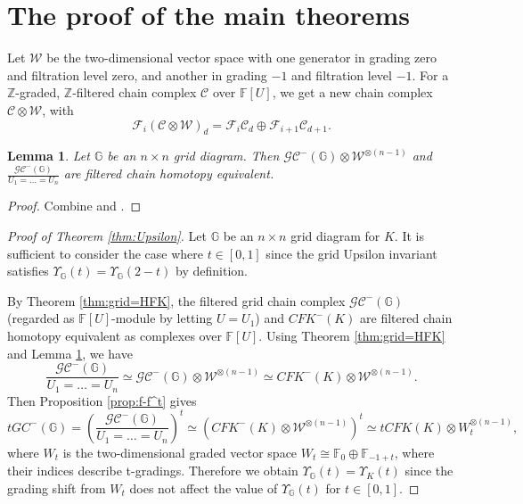\documentclass[12pt]{amsart}
\theoremstyle{plain}
\theoremstyle{definition}
\theoremstyle{plain}
\newtheorem{lem}[thm]{Lemma}
\theoremstyle{definition}
\newcommand{\G}{\mathbb{G}}
\numberwithin{equation}{section}
\begin{document}
\section{The proof of the main theorems}


Let $\mathcal{W}$ be the two-dimensional vector space with one generator in grading zero and filtration level zero, and another in grading $-1$ and filtration level $-1$.
For a $\mathbb{Z}$-graded, $\mathbb{Z}$-filtered chain complex $\mathcal{C}$ over $\mathbb{F}[U]$, we get a new chain complex $\mathcal{C}\otimes \mathcal{W}$, with
\[
\mathcal{F}_i(\mathcal{C}\otimes \mathcal{W})_d=\mathcal{F}_i\mathcal{C}_d\oplus \mathcal{F}_{i+1}\mathcal{C}_{d+1}.
\]

\begin{lem}
\label{lem:u1=un}
Let $\G$ be an $n \times n$ grid diagram.
Then $\mathcal{GC}^-(\G)\otimes \mathcal{W}^{\otimes (n-1)}$ and $\frac{\mathcal{GC}^-(\G)}{U_1=\dots=U_n}$ are filtered chain homotopy equivalent.
\end{lem}
\begin{proof}
Combine \cite[Lemma 14.1.11]{Grid-homology-for-knots-and-links} and \cite[Proposition A.8.1]{Grid-homology-for-knots-and-links}.
\end{proof}



\begin{proof}[Proof of Theorem \ref{thm:Upsilon}]
Let $\G$ be an $n \times n$ grid diagram for $K$.
It is sufficient to consider the case where $t\in[0,1]$ since the grid Upsilon invariant satisfies $\Upsilon_\G(t)=\Upsilon_\G(2-t)$ by definition.

By Theorem \ref{thm:grid=HFK}, the filtered grid chain complex $\mathcal{GC}^-(\G)$ (regarded as $\mathbb{F}[U]$-module by letting $U=U_1$) and $CFK^-(K)$ are filtered chain homotopy equivalent as complexes over $\mathbb{F}[U]$.
Using Theorem \ref{thm:grid=HFK} and Lemma \ref{lem:u1=un}, we have
\[
\frac{\mathcal{GC}^-(\G)}{U_1=\dots=U_n} \simeq \mathcal{GC}^-(\G)\otimes \mathcal{W}^{\otimes (n-1)} \simeq CFK^-(K)\otimes \mathcal{W}^{\otimes (n-1)}.
\]
Then Proposition \ref{prop:f-f^t} gives
\[
tGC^-(\G)=\left(\frac{\mathcal{GC}^-(\G)}{U_1=\dots=U_n}\right)^t \simeq (CFK^-(K)\otimes \mathcal{W}^{\otimes (n-1)})^t \simeq tCFK(K)\otimes W_t^{\otimes (n-1)},
\]
where $W_t$ is the two-dimensional graded vector space $W_t\cong\mathbb{F}_{0}\oplus\mathbb{F}_{-1+t}$, where their indices describe t-gradings.
Therefore we obtain $\Upsilon_{\G}(t)=\Upsilon_K(t)$ since the grading shift from $W_t$ does not affect the value of $\Upsilon_{\G}(t)$ for $t\in[0,1]$.
\end{proof}
\end{document}
